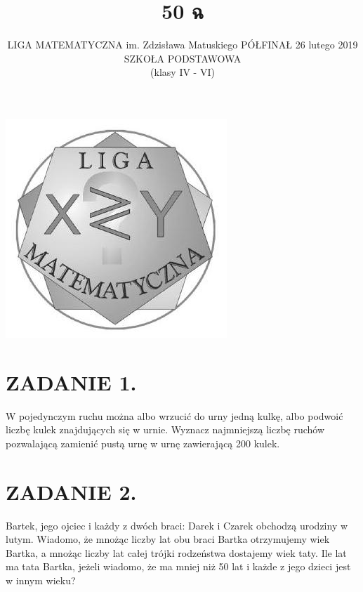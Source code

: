 \documentclass[10pt]{article}
\title{50 ฉ }
\author{LIGA MATEMATYCZNA im. Zdzisława Matuskiego PÓŁFINAŁ 26 lutego 2019 SZKOŁA PODSTAWOWA\\
(klasy IV - VI)}
\date{}
\begin{document}
\maketitle
\begin{center}
\includegraphics[max width=\textwidth]{2024_11_21_71e9dc1a1f07adbf8fc8g-1}
\end{center}



\section*{ZADANIE 1.}
W pojedynczym ruchu można albo wrzucić do urny jedną kulkę, albo podwoić liczbę kulek znajdujących się w urnie. Wyznacz najmniejszą liczbę ruchów pozwalającą zamienić pustą urnę w urnę zawierającą 200 kulek.

\section*{ZADANIE 2.}
Bartek, jego ojciec i każdy z dwóch braci: Darek i Czarek obchodzą urodziny w lutym. Wiadomo, że mnożąc liczby lat obu braci Bartka otrzymujemy wiek Bartka, a mnożąc liczby lat całej trójki rodzeństwa dostajemy wiek taty. Ile lat ma tata Bartka, jeżeli wiadomo, że ma mniej niż 50 lat i każde z jego dzieci jest w innym wieku?
\end{document}
